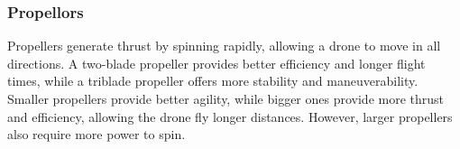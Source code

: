 \documentclass[sigconf,review]{acmart}
\begin{document}


\subsubsection{Propellors}
\label{sec:propellors}

Propellers generate thrust by spinning rapidly, allowing a drone to move in all directions. 
A two-blade propeller provides better efficiency and longer flight times, while a triblade propeller offers more stability and maneuverability. 
Smaller propellers provide better agility, while bigger ones provide more thrust and efficiency, allowing the drone fly longer distances. 
However, larger propellers also require more power to spin.
\end{document}

